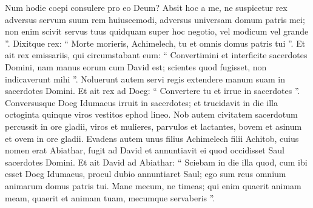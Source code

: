 \begin{biblechapter}
\begin{biblechapter}
\begin{biblechapter}
\begin{biblechapter}
\begin{biblechapter}
\begin{biblechapter}
\begin{biblechapter}
\begin{biblechapter}
\begin{biblechapter}
\begin{biblechapter}
\begin{biblechapter}
\begin{biblechapter}
\begin{biblechapter}
\begin{biblechapter}
\begin{biblechapter}
\begin{biblechapter}
\begin{biblechapter}
\begin{biblechapter}
\begin{biblechapter}
\begin{biblechapter}
\begin{biblechapter}
\begin{biblechapter}
\verse Num hodie coepi consulere pro eo Deum? Absit hoc a me, ne suspicetur rex adversus servum suum rem huiuscemodi, adversus universam domum patris mei; non enim scivit servus tuus quidquam super hoc negotio, vel modicum vel grande ”. 
\verse Dixitque rex: “ Morte morieris, Achimelech, tu et omnis domus patris tui ”.
 \verse Et ait rex emissariis, qui circumstabant eum: “ Convertimini et interficite sacerdotes Domini, nam manus eorum cum David est; scientes quod fugisset, non indicaverunt mihi ”. Noluerunt autem servi regis extendere manum suam in sacerdotes Domini. 
\verse Et ait rex ad Doeg: “ Convertere tu et irrue in sacerdotes ”. Conversusque Doeg Idumaeus irruit in sacerdotes; et trucidavit in die illa octoginta quinque viros vestitos ephod lineo. 
\verse Nob autem civitatem sacerdotum percussit in ore gladii, viros et mulieres, parvulos et lactantes, bovem et asinum et ovem in ore gladii.
 \verse Evadens autem unus filius Achimelech filii Achitob, cuius nomen erat Abiathar, fugit ad David 
\verse et annuntiavit ei quod occidisset Saul sacerdotes Domini. 
\verse Et ait David ad Abiathar: “ Sciebam in die illa quod, cum ibi esset Doeg Idumaeus, procul dubio annuntiaret Saul; ego sum reus omnium animarum domus patris tui. 
\verse Mane mecum, ne timeas; qui enim quaerit animam meam, quaerit et animam tuam, mecumque servaberis ”.
 

\end{biblechapter}
\end{biblechapter}
\end{biblechapter}
\end{biblechapter}
\end{biblechapter}
\end{biblechapter}
\end{biblechapter}
\end{biblechapter}
\end{biblechapter}
\end{biblechapter}
\end{biblechapter}
\end{biblechapter}
\end{biblechapter}
\end{biblechapter}
\end{biblechapter}
\end{biblechapter}
\end{biblechapter}
\end{biblechapter}
\end{biblechapter}
\end{biblechapter}
\end{biblechapter}
\end{biblechapter}
